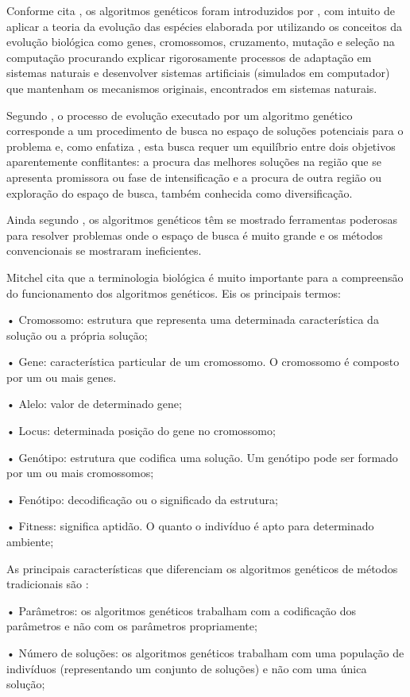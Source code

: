 
Conforme cita \cite{oliveira2005algoritmo}, os algoritmos genéticos foram introduzidos 
por \cite{holland1975adaptation}, com intuito de aplicar a teoria da evolução das espécies 
elaborada por \cite{darwin1968origin} utilizando os conceitos da evolução biológica como 
genes, cromossomos, cruzamento, mutação e seleção na computação procurando explicar rigorosamente processos de adaptação em sistemas naturais e desenvolver sistemas artificiais (simulados em computador) que mantenham os mecanismos originais, encontrados em sistemas naturais.\par

Segundo \cite{oliveira2005algoritmo}, o processo de evolução executado por um algoritmo genético corresponde a um procedimento de busca no espaço de soluções potenciais para o problema e, como enfatiza \cite{michalewicz1996evolutionary}, esta busca requer um equilíbrio entre dois objetivos aparentemente conflitantes: a procura das melhores soluções na região que se apresenta promissora ou fase de intensificação e a procura de outra região ou exploração do espaço de busca, também conhecida como diversificação.\par
Ainda segundo \cite{oliveira2005algoritmo}, os algoritmos genéticos têm se mostrado ferramentas poderosas para resolver problemas onde o espaço de busca é muito grande e os métodos convencionais se mostraram ineficientes.\par

Mitchel \cite{mitchell1998introduction} cita que a terminologia biológica é muito importante para a compreensão do funcionamento dos algoritmos genéticos. Eis os principais termos: \par
•  Cromossomo: estrutura que representa uma determinada característica da solução ou a própria solução; \par
•  Gene: característica particular de um cromossomo. O cromossomo é composto por um ou mais genes. \par
•  Alelo: valor de determinado gene;\par
•  Locus: determinada posição do gene no cromossomo;\par
•  Genótipo: estrutura que codifica uma solução. Um genótipo pode ser formado por um ou mais cromossomos; \par
•  Fenótipo: decodificação ou o significado da estrutura; \par
•  Fitness: significa aptidão. O quanto o indivíduo é apto para determinado ambiente; \par
As principais características que diferenciam os algoritmos genéticos de métodos tradicionais são \cite{goldberg1989genetic}: \par
•  Parâmetros: os algoritmos genéticos trabalham com a codificação dos parâmetros e não com os parâmetros propriamente; \par
•  Número de soluções: os algoritmos genéticos trabalham com uma população de indivíduos (representando um conjunto de soluções) e não com uma única solução; \par

